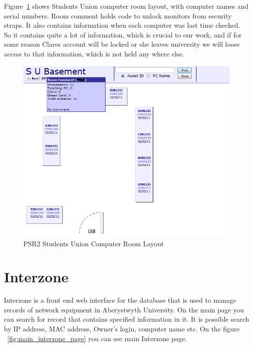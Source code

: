 \documentclass[10pt,a4paper,headinclude=true]{report}
\begin{document}
Figure~\ref{fig:PSR2_SU_Room_layout} shows Students Union computer room layout, with computer names and serial numbers. Room comment holds code to unlock monitors from security straps. It also contains information when each computer was last time checked. So it contains quite a lot of information, which is crucial to our work, and if for some reason Clares account will be locked or she leaves university we will loose access to that information, which is not held any where else.

\begin{figure}[H]
\begin{center}
\includegraphics[scale=0.5]{./PSR2_SU_Room_layout}
\caption{PSR2 Students Union Computer Room Layout}
\label{fig:PSR2_SU_Room_layout}
\end{center}
\end{figure}


\section{Interzone}
Interzone is a front end web interface for the database that is used to manage records of network equipment in Aberystwyth University. On the main page you can search for record that contains specified information in it. It is possible search by IP address, MAC address, Owner's login, computer name etc. On the figure ~\ref{fig:main_interzone_page} you can see main Interzone page.
\end{document}
